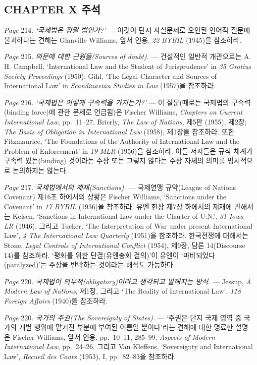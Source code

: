{\footnotesize

\subsection{CHAPTER X 주석}\label{chapter-x-uxc8fcuxc11d}

\emph{Page} 214. \emph{`국제법은 정말 법인가?'} --- 이것이 단지
사실문제로 오인된 언어적 질문에 불과하다는 견해는 Glanville Williams,
앞서 인용, \emph{22 BYBIL} (1945)을 참조하라.

\emph{Page} 215. \emph{의문에 대한 근원들(Sources of doubt).} ---
건설적인 일반적 개관으로는 A. H. Campbell, `International Law and the
Student of Jurisprudence' in \emph{35 Grotius Society Proceedings}
(1950); Gihl, `The Legal Character and Sources of International Law' in
\emph{Scandinavian Studies in Law} (1957)을 참조하라.

\emph{Page} 216. \emph{`국제법은 어떻게 구속력을 가지는가?'} --- 이
질문(때로는 국제법의 구속력(binding force)에 관한 문제로 언급됨)은
Fischer Williams, \emph{Chapters on Current International Law},
pp.~11--27; Brierly, \emph{The Law of Nations}, 제5판 (1955), 제2장;
\emph{The Basis of Obligation in International Law} (1958), 제1장을
참조하라. 또한 Fitzmaurice, `The Foundations of the Authority of
International Law and the Problem of Enforcement' in \emph{19 MLR}
(1956)을 참조하라. 이들 저자들은 규칙 체계가 구속력 있는(binding)
것이라는 주장 또는 그렇지 않다는 주장 자체의 의미를 명시적으로
논의하지는 않는다.

\emph{Page} 217. \emph{국제법에서의 제재(Sanctions).} --- 국제연맹
규약(League of Nations Covenant) 제16조 하에서의 상황은 Fischer
Williams, `Sanctions under the Covenant' in \emph{17 BYBIL} (1936)을
참조하라. 유엔 헌장 제7장 하에서의 제재에 관해서는 Kelsen, `Sanctions in
International Law under the Charter of U.N.', \emph{31 Iowa LR} (1946),
그리고 Tucker, `The Interpretation of War under present International
Law', \emph{4 The International Law Quarterly} (1951)을 참조하라.
한국전쟁에 대해서는 Stone, \emph{Legal Controls of International
Conflict} (1954), 제9장, 담론 14(Discourse 14)를 참조하라. `평화를 위한
단결(유엔총회 결의)'이 유엔이 `마비되었다(paralyzed)'는 주장을 반박하는
것이라는 해석도 가능하다.

\emph{Page} 220. \emph{국제법이 의무적(obligatory)이라고 생각되고
말해지는 방식.} --- Jessup, \emph{A Modern Law of Nations}, 제1장,
그리고 `The Reality of International Law', \emph{118 Foreign Affairs}
(1940)을 참조하라.

\emph{Page} 220. \emph{국가의 주권(The Sovereignty of States).} ---
`주권은 단지 국제 영역 중 국가의 개별 행위에 맡겨진 부분에 부여된 이름일
뿐이다'라는 견해에 대한 명료한 설명은 Fischer Williams, 앞서 인용,
pp.~10--11, 285--99, \emph{Aspects of Modern International Law},
pp.~24--26, 그리고 Van Kleffens, `Sovereignty and International Law',
\emph{Recueil des Cours} (1953), I, pp.~82--83을 참조하라.

}
